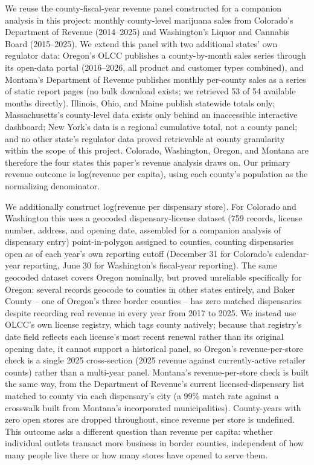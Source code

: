 ﻿\documentclass{article}
\begin{document}
We reuse the county-fiscal-year revenue panel constructed for a companion analysis in this project: monthly
county-level marijuana sales from Colorado's Department of Revenue (2014--2025) and Washington's Liquor
and Cannabis Board (2015--2025). We extend this panel with two additional states' own regulator data:
Oregon's OLCC publishes a county-by-month sales series through its open-data portal (2016--2026, all
product and customer types combined), and Montana's Department of Revenue publishes monthly per-county
sales as a series of static report pages (no bulk download exists; we retrieved 53 of 54 available months
directly). Illinois, Ohio, and Maine publish statewide totals only; Massachusetts's county-level data
exists only behind an inaccessible interactive dashboard; New York's data is a regional cumulative total,
not a county panel; and no other state's regulator data proved retrievable at county granularity within
the scope of this project. Colorado, Washington, Oregon, and Montana are therefore the four states this
paper's revenue analysis draws on. Our primary revenue outcome is log(revenue per capita), using each
county's population as the normalizing denominator.

We additionally construct log(revenue per dispensary store). For Colorado and Washington this uses a
geocoded dispensary-license dataset (759 records, license number, address, and opening date, assembled for
a companion analysis of dispensary entry) point-in-polygon assigned to counties, counting dispensaries open
as of each year's own reporting cutoff (December 31 for Colorado's calendar-year reporting, June 30 for
Washington's fiscal-year reporting). The same geocoded dataset covers Oregon nominally, but proved
unreliable specifically for Oregon: several records geocode to counties in other states entirely, and
Baker County -- one of Oregon's three border counties -- has zero matched dispensaries despite recording
real revenue in every year from 2017 to 2025. We instead use OLCC's own license registry, which tags
county natively; because that registry's date field reflects each license's most recent renewal rather
than its original opening date, it cannot support a historical panel, so Oregon's revenue-per-store check
is a single 2025 cross-section (2025 revenue against currently-active retailer counts) rather than a
multi-year panel. Montana's revenue-per-store check is built the same way, from the Department of
Revenue's current licensed-dispensary list matched to county via each dispensary's city (a 99\% match
rate against a crosswalk built from Montana's incorporated municipalities). County-years with zero open
stores are dropped throughout, since revenue per store is undefined. This outcome asks a different
question than revenue per capita: whether individual outlets transact more business in border counties,
independent of how many people live there or how many stores have opened to serve them.
\end{document}
